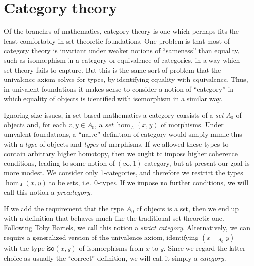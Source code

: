 \chapter{Category theory}
\label{cha:category-theory}

Of the branches of mathematics, category theory is one which perhaps fits the least comfortably in set theoretic foundations.
One problem is that most of category theory is invariant under weaker notions of ``sameness'' than equality, such as isomorphism in a category or equivalence of categories, in a way which set theory fails to capture.
But this is the same sort of problem that the univalence axiom solves for types, by identifying equality with equivalence.
Thus, in univalent foundations it makes sense to consider a notion of ``category'' in which equality of objects is identified with isomorphism in a similar way.

Ignoring size issues, in set-based mathematics a category consists of a \emph{set} $A_0$ of objects and, for each $x,y\in A_0$, a \emph{set} $\hom_A(x,y)$ of morphisms.
Under univalent foundations, a ``naive'' definition of category would simply mimic this with a \emph{type} of objects and \emph{types} of morphisms.
If we allowed these types to contain arbitrary higher homotopy, then we ought to impose higher coherence conditions, leading to some notion of $(\infty,1)$-category,
%
but at present our goal is more modest.
We consider only 1-categories, and therefore we restrict the types $\hom_A(x,y)$ to be sets, i.e.\ 0-types.
If we impose no further conditions, we will call this notion a \emph{precategory}.

If we add the requirement that the type $A_0$ of objects is a set, then we end up with a definition that behaves much like the traditional set-theoretic one.
Following Toby Bartels, we call this notion a \emph{strict category}.
%
Alternatively, we can require a generalized version of the univalence axiom, identifying $(x=_{A_0} y)$ with the type $\mathsf{iso}(x,y)$ of isomorphisms from $x$ to $y$.
Since we regard the latter choice as usually the ``correct'' definition, we will call it simply a \emph{category}.

